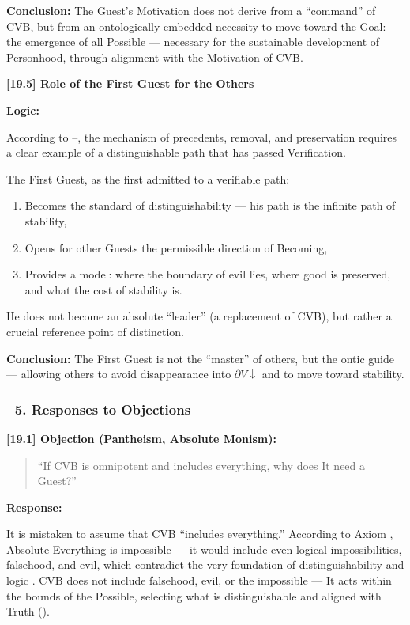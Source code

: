 \documentclass[12pt]{article}
\begin{document}
\textbf{Conclusion:} The Guest’s Motivation does not derive from a ``command'' of CVB, but from an ontologically embedded necessity to move toward the Goal: the emergence of all Possible — necessary for the sustainable development of Personhood, through alignment with the Motivation of CVB.

\bigskip

\textbf{[19.5] Role of the First Guest for the Others}

\textbf{Logic:}

According to \text{[11.10]}–\text{[11.12]}, the mechanism of precedents, removal, and preservation requires a clear example of a distinguishable path that has passed Verification.

The First Guest, as the first admitted to a verifiable path:
\begin{enumerate}
\item Becomes the standard of distinguishability — his path is the infinite path of stability,
\item Opens for other Guests the permissible direction of Becoming,
\item Provides a model: where the boundary of evil lies, where good is preserved, and what the cost of stability is.
\end{enumerate}

He does not become an absolute ``leader'' (a replacement of CVB), but rather a crucial reference point of distinction.

\textbf{Conclusion:} The First Guest is not the ``master'' of others, but the ontic guide — allowing others to avoid disappearance into $\partial V \downarrow$ and to move toward stability.

\subsubsection*{🔹 5. Responses to Objections}

\textbf{[19.1] Objection (Pantheism, Absolute Monism):}

\begin{quote}
``If CVB is omnipotent and includes everything, why does It need a Guest?''
\end{quote}

\textbf{Response:}

It is mistaken to assume that CVB ``includes everything.'' According to Axiom \text{[2]}, Absolute Everything is impossible — it would include even logical impossibilities, falsehood, and evil, which contradict the very foundation of distinguishability \text{[9]} and logic \text{[11.1]}. CVB does not include falsehood, evil, or the impossible — It acts within the bounds of the Possible, selecting what is distinguishable and aligned with Truth (\text{[11.2.1]}).
\end{document}
